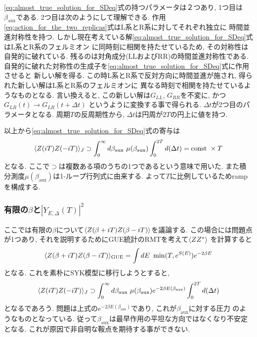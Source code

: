 \eqref{eq:almost_true_solution_for_SDeq}式の持つパラメータは２つあり, 
1つ目は$\beta_{\mathrm{aux}}$である. 
2つ目は次のようにして理解できる. 
作用\eqref{eq:action_for_the_two_replicas}式はL系とR系に対してそれぞれ独立に
時間並進対称性を持つ. 
しかし現在考えている解\eqref{eq:almost_true_solution_for_SDeq}式はL系とR系のフェルミオン
に同時刻に相関を持たせているため, その対称性は自発的に破れている. 
残るのは対角成分(LLおよびRR)の時間並進対称性である. 
自発的に破れた対称性の生成子を\eqref{eq:almost_true_solution_for_SDeq}式に作用させると
新しい解を得る. 
この時L系とR系で反対方向に時間並進が施され, 得られた新しい解はL系とR系のフェルミオンに
異なる時刻で相関を持たせているようなものとなる. 
言い換えると, この新しい解は$G_{LL}$, $G_{RR}$を不変に, かつ$G_{LR}(t) \to G_{LR}(t + \Delta t)$
というように変換する事で得られる. 
$\Delta t$が2つ目のパラメータとなる. 
周期$T$の反周期性から, $\Delta t$は円周が$2T$の円上に値を持つ. 

以上から\eqref{eq:almost_true_solution_for_SDeq}式の寄与は
\begin{align}
	\langle Z(iT)Z(-iT) \rangle_J \supset
	\int_0^{\infty}d\beta_{\mathrm{aux}}\ \mu(\beta_{\mathrm{aux}})
	\int_0^{2T} d(\Delta t)
	= \mathrm{const}\ \times T
\end{align}
となる. 
ここで$\supset$は複数ある項のうちの1つであるという意味で用いた.
また積分測度$\mu(\beta_{\mathrm{aux}})$は1-ループ行列式に由来する. 
よって$T$に比例しているためrampを構成する. 

\subsubsection{有限の$\beta$と$|Y_{E,\Delta}(T)|^2$}
ここでは有限の$\beta$について$\langle Z(\beta + iT)Z(\beta - iT) \rangle$を議論する. 
この場合には問題点が1つあり, それを説明するためにGUE統計のRMTを考えて$\langle ZZ^* \rangle$
を計算すると
\begin{align}
	\langle Z(\beta + iT)Z(\beta - iT) \rangle_{\mathrm{GUE}}
	=\int dE\ \min(T, e^{S(E)})e^{-2\beta E}
\end{align}
となる. 
これを素朴にSYK模型に移行しようとすると, 
\begin{align}
	\average{Z(iT)Z(-iT)}_J \supset
	\int_0^{\infty}d\beta_{\mathrm{aux}}\ \mu(\beta_{\mathrm{aux}})e^{-2\beta E(\beta_{\mathrm{aux}})}
	\int_0^{2T} d(\Delta t)
\end{align}
となるであろう. 
問題は上式の$e^{-2\beta E(\beta_{\mathrm{aux}})}$であり, これが$\beta_{\mathrm{aux}}$に対する圧力
のようなものとなっている. 
従って$\beta_{\mathrm{aux}}$は最早作用の平坦な方向ではなくなり不安定となる. 
これが原因で非自明な鞍点を期待する事ができない. 

